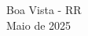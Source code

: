 \begin{titlepage}
\begin{center}
        {\bfseries\Large 
            \makeatletter
            \@author
            \makeatother
        }\\[1.5cm]

        {\bfseries\LARGE 
            \makeatletter
            \@title
            \makeatother
        }\\[3.5cm]

        {\large Boa Vista - RR\\
        Maio de 2025}
    \end{center}
\end{titlepage}
